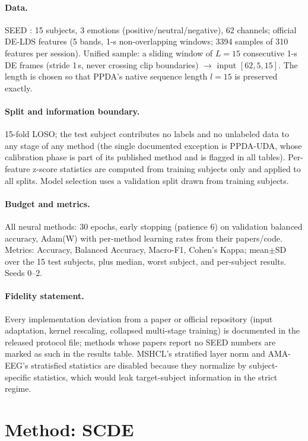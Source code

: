 \documentclass{article}
\newcommand{\method}{SCDE}
\begin{document}
\paragraph{Data.} SEED \citep{zheng2015seed}: 15 subjects, 3 emotions
(positive/neutral/negative), 62 channels; official DE-LDS features (5 bands,
1-s non-overlapping windows; 3394 samples of 310 features per session).
Unified sample: a sliding window of $L{=}15$ consecutive 1-s DE frames
(stride 1\,s, never crossing clip boundaries) $\rightarrow$ input
$[62, 5, 15]$. The length is chosen so that PPDA's native sequence length
$l{=}15$ \citep{zhao2021ppda} is preserved exactly.

\paragraph{Split and information boundary.} 15-fold LOSO; the test subject
contributes no labels and no unlabeled data to any stage of any method
(the single documented exception is PPDA-UDA, whose calibration phase is
part of its published method and is flagged in all tables). Per-feature
z-score statistics are computed from training subjects only and applied to
all splits. Model selection uses a validation split drawn from training
subjects.

\paragraph{Budget and metrics.} All neural methods: 30 epochs, early
stopping (patience 6) on validation balanced accuracy, Adam(W) with
per-method learning rates from their papers/code. Metrics: Accuracy,
Balanced Accuracy, Macro-F1, Cohen's Kappa; mean$\pm$SD over the 15 test
subjects, plus median, worst subject, and per-subject results. Seeds 0--2.

\paragraph{Fidelity statement.} Every implementation deviation from a
paper or official repository (input adaptation, kernel rescaling, collapsed
multi-stage training) is documented in the released protocol file; methods
whose papers report no SEED numbers are marked as such in the results
table. MSHCL's stratified layer norm and AMA-EEG's stratisfied statistics
are disabled because they normalize by subject-specific statistics, which
would leak target-subject information in the strict regime.

\section{Method: \method{}}
\label{sec:method}
\end{document}

